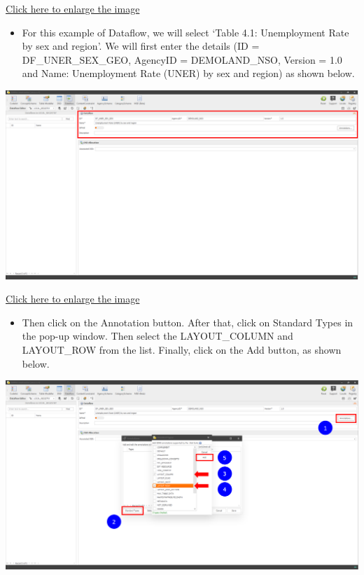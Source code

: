 \documentclass[
]{book}
\providecommand{\tightlist}{%
  \setlength{\itemsep}{0pt}\setlength{\parskip}{0pt}}
\begin{document}
\href{images/image258.png}{Click here to enlarge the image}

\begin{itemize}
\tightlist
\item
  For this example of Dataflow, we will select `Table 4.1: Unemployment Rate by sex and region'. We will first enter the details (ID = DF\_UNER\_SEX\_GEO, AgencyID = DEMOLAND\_NSO, Version = 1.0 and Name: Unemployment Rate (UNER) by sex and region) as shown below.
\end{itemize}

\begin{center}\includegraphics[width=1\linewidth]{./images/image259} \end{center}

\href{images/image259.png}{Click here to enlarge the image}

\begin{itemize}
\tightlist
\item
  Then click on the Annotation button. After that, click on Standard Types in the pop-up window. Then select the LAYOUT\_COLUMN and LAYOUT\_ROW from the list. Finally, click on the Add button, as shown below.
\end{itemize}

\begin{center}\includegraphics[width=1\linewidth]{./images/image260} \end{center}
\end{document}
